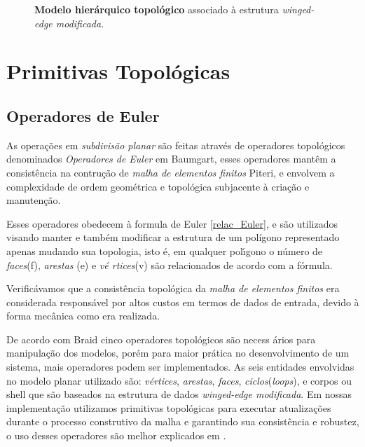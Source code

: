 \documentclass[12pt,a4paper]{book}
\begin{document}
\begin{figure}[htbp]
  \begin{center}
    \leavevmode
    
    \caption{{\bf{Modelo hier\'{a}rquico topol\'{o}gico}} associado \`{a} estrutura {\textit{winged-edge modificada}}. }
    \label{fig10_chapter4}
  \end{center}
\end{figure}

\section{Primitivas Topol\'{o}gicas}

\subsection{Operadores de Euler}

As opera\c{c}\~{o}es em \textit{subdivis\~{a}o planar} s\~{a}o feitas atrav\'{e}s de operadores topol\'{o}gicos denominados \textit{Operadores de Euler} em Baumgart\cite{baumgart}, esses operadores mant\^{e}m a consist\^{e}ncia na contru\c{c}\~{a}o de \textit{malha de elementos finitos} Piteri\cite{piteri2}, e
envolvem a complexidade de ordem geom\'{e}trica e topol\'{o}gica subjacente 
\`{a} cria\c{c}\~{a}o e manuten\c{c}\~{a}o.

Esses operadores obedecem \`{a} formula de Euler \ref{relac_Euler},
e s\~{a}o utilizados visando manter e tamb\'{e}m modificar a estrutura de 
um pol\'igono representado apenas mudando sua topologia, isto \'{e}, em qualquer
pol\'{\i}gono o n\'{u}mero de \textit{faces}(f), \textit{arestas} (e) e \textit{v\'{e} rtices}(v) s\~{a}o relacionados de acordo com a f\'{o}rmula.

Verific\'{a}vamos que a consist\^{e}ncia topol\'{o}gica da \textit{malha de
elementos finitos }era considerada respons\'{a}vel por altos custos em
termos de dados de entrada, devido \`{a} forma mec\^{a}nica como era realizada.

De acordo com Braid \cite{braid} cinco operadores topol\'{o}gicos s\~{a}o necess%
\'{a}rios para manipula\c{c}\~{a}o dos modelos, por\'{e}m para maior pr\'{a}tica no desenvolvimento de um sistema, mais operadores podem ser implementados. As seis entidades envolvidas no modelo planar utilizado s\~{a}o: \textit{v\'{e}rtices}, \textit{arestas}, \textit{faces}, \textit{ciclos}(\textit{loops}), e corpos ou shell que s\~{a}o baseados na estrutura de dados \textit{winged-edge modificada}. Em nossas implementa\c{c}\~ao utilizamos primitivas topol\'ogicas para executar atualiza\c{c}\~oes durante o processo construtivo da malha e garantindo sua consist\^encia e robustez, o uso desses operadores s\~ao melhor explicados em \cite{piteri2}.
\end{document}
